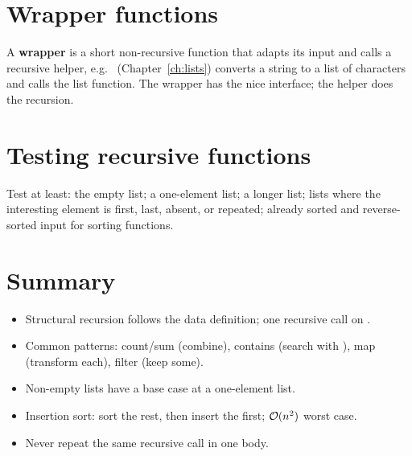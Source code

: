 \section{Wrapper functions}
A \textbf{wrapper} is a short non-recursive function that adapts its input and
calls a recursive helper, e.g.\  (Chapter~\ref{ch:lists})
converts a string to a list of characters and calls the list function. The
wrapper has the nice interface; the helper does the recursion.

\section{Testing recursive functions}
Test at least: the empty list; a one-element list; a longer list; lists where
the interesting element is first, last, absent, or repeated; already sorted
and reverse-sorted input for sorting functions.

\section{Summary}
\begin{itemize}
  \item Structural recursion follows the data definition; one recursive call on .
  \item Common patterns: count/sum (combine), contains (search with ), map (transform each), filter (keep some).
  \item Non-empty lists have a base case at a one-element list.
  \item Insertion sort: sort the rest, then insert the first; $\mathcal{O}(n^2)$ worst case.
  \item Never repeat the same recursive call in one body.
\end{itemize}
